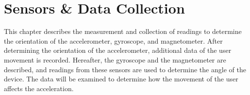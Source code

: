 \chapter{Sensors \& Data Collection}\label{chapter:data-collection}
This chapter describes the measurement and collection of readings to determine the orientation of the accelerometer, gyroscope, and magnetometer.
After determining the orientation of the accelerometer, additional data of the user movement is recorded.
Hereafter, the gyroscope and the magnetometer are described, and readings from these sensors are used to determine the angle of the device.
The data will be examined to determine how the movement of the user affects the acceleration.





